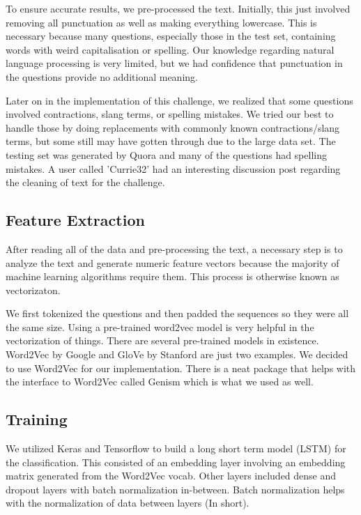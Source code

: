 \documentclass{article}
\begin{document}
To ensure accurate results, we pre-processed the text. Initially, this
just involved removing all punctuation as well as making everything lowercase.
This is necessary because many questions, especially those in the test set,
containing words with weird capitalisation or spelling. Our knowledge
regarding natural language processing is very limited, but we had confidence
that punctuation in the questions provide no additional meaning.

Later on in the implementation of this challenge, we realized that some
questions involved contractions, slang terms, or spelling mistakes. We tried
our best to handle those by doing replacements with commonly known
contractions/slang terms, but some still may have gotten through due to the
large data set. The testing set was generated by Quora and many of the
questions had spelling mistakes. A user called 'Currie32' had an interesting
discussion post regarding the cleaning of text for the challenge.

\subsection{Feature Extraction}

After reading all of the data and pre-processing the text, a necessary step is
to analyze the text and generate numeric feature vectors because the majority
of machine learning algorithms require them. This process is otherwise known
as vectorizaton.

We first tokenized the questions and then padded the sequences so they were
all the same size. Using a pre-trained word2vec model is very helpful in the
vectorization of things. There are several pre-trained models in existence.
Word2Vec by Google and GloVe by Stanford are just two examples. We decided
to use Word2Vec for our implementation. There is a neat package that helps
with the interface to Word2Vec called Genism which is what we used as well.

\subsection{Training}

We utilized Keras and Tensorflow to build a long short term model (LSTM)
for the classification. This consisted of an embedding layer involving an
embedding matrix generated from the Word2Vec vocab. Other layers included
dense and dropout layers with batch normalization in-between. Batch
normalization helps with the normalization of data between layers (In short).
\end{document}
